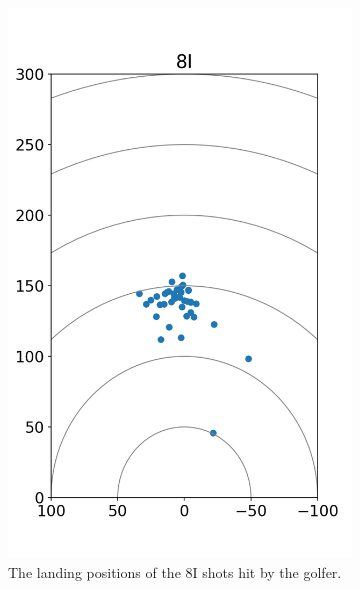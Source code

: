 \documentclass{kththesis}
\begin{document}
\begin{figure}
\begin{subfigure}{0.4\textwidth}
    \includegraphics[height=0.4\textheight]{Shots/8I_shots.png} 
    \caption{The landing positions of the 8I shots hit by the golfer.}
    \label{fig:8I_shots}
    \end{subfigure}
    \begin{subfigure}{0.4\textwidth}
    \centering

\end{subfigure}
\end{figure}
\end{document}

